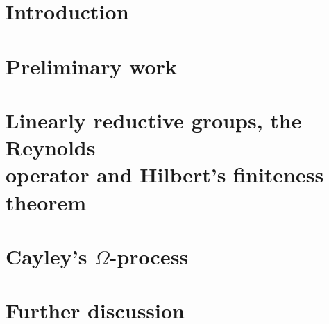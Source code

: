 \documentclass[a4paper]{article}
\theoremstyle{prrt}
\begin{document}


\newpage

\tableofcontents
\vfill

\section{Introduction}


\newpage

\section{Preliminary work}\label{pw}



\section[Linearly reductive groups, the Reynolds operator and Hilbert's finiteness theorem]{Linearly reductive groups, the Reynolds \\operator and Hilbert's finiteness theorem}



\section{Cayley's $\Omega$-process}



\section{Further discussion}


\newpage

% 
%
% 


\end{document}
